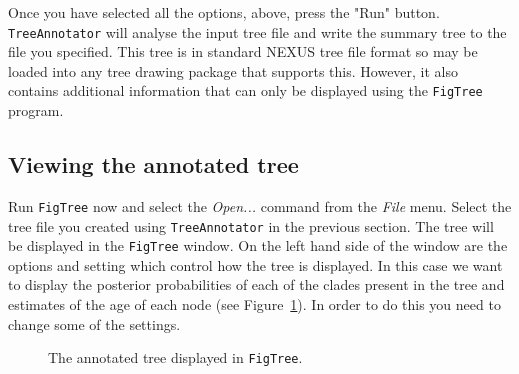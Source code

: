 \documentclass[cup7b, english]{cupbook}
\begin{document}
Once you have selected all the options, above, press the "Run" button. \texttt{TreeAnnotator} will analyse
the input tree file and write the summary tree to the file you specified. This tree is in
standard NEXUS tree file format so may be loaded into any tree drawing package that supports this.
However, it also contains additional information that can only be displayed using the \texttt{FigTree}
program.

\subsection{Viewing the annotated tree}

Run \texttt{FigTree} now and select the {\it Open...} command from the {\it File} menu. Select the tree file
you created using \texttt{TreeAnnotator} in the previous section. The tree will be displayed in the \texttt{FigTree}
window. On the left hand side of the window are the options and setting which control how the
tree is displayed. In this case we want to display the posterior probabilities of each of the clades
present in the tree and estimates of the age of each node (see Figure~\ref{fig:figure11}). In order
to do this you need to change some of the settings.

\begin{figure}[htbp]
\begin{center}
\leavevmode
{}
\end{center}
\caption{The annotated tree displayed in \texttt{FigTree}.}
\label{fig:figure11}
\end{figure}
\end{document}
